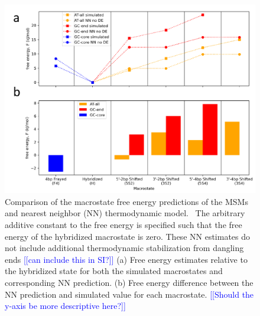\documentclass[journal=jpcbfk,manuscript=article]{achemso}
\newcommand*{\noteb}[1]{\textcolor{blue}{[[#1]]}}		%
\begin{document}
\begin{figure}[ht!]
	\begin{center} 
        \includegraphics[width=160mm, scale=1]{Fig3_no_DE.pdf}
        \caption{Comparison of the macrostate free energy predictions of the MSMs and nearest neighbor (NN) thermodynamic model.~\citep{SantaLucia1998AThermodynamics, Santalucia2004TM} The arbitrary additive constant to the free energy is specified such that the free energy of the hybridized macrostate is zero. These NN estimates do not include additional thermodynamic stabilization from dangling ends \noteb{can include this in SI?} (a) Free energy estimates relative to the hybridized state for both the simulated macrostates and corresponding NN prediction. (b) Free energy difference between the NN prediction and simulated value for each macrostate. \noteb{Should the y-axis be more descriptive here?}}
        \label{fig:NN_table_no_de}
	\end{center}
\end{figure}


\end{document}

